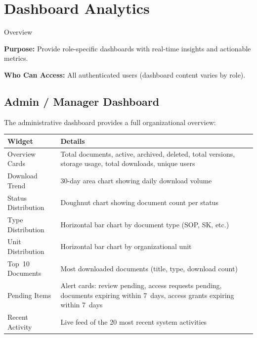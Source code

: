 \section{Dashboard Analytics}

\begin{ugModule}{Overview}

  \textbf{Purpose:}
  Provide role-specific dashboards with real-time insights and
  actionable metrics.

  \textbf{Who Can Access:}
  All authenticated users (dashboard content varies by role).
\end{ugModule}

\subsection{Admin / Manager Dashboard}

The administrative dashboard provides a full organizational
overview:

\begin{tabularx}{\textwidth}{@{} l X @{}}
  \toprule
  \textbf{Widget} & \textbf{Details} \\
  \midrule
  Overview Cards
    & Total documents, active, archived, deleted, total
      versions, storage usage, total downloads,
      unique users \\
  Download Trend
    & 30-day area chart showing daily download volume \\
  Status Distribution
    & Doughnut chart showing document count per status \\
  Type Distribution
    & Horizontal bar chart by document type
      (SOP, SK, etc.) \\
  Unit Distribution
    & Horizontal bar chart by organizational unit \\
  Top~10 Documents
    & Most downloaded documents (title, type,
      download count) \\
  Pending Items
    & Alert cards: review pending, access requests
      pending, documents expiring within 7~days,
      access grants expiring within 7~days \\
  Recent Activity
    & Live feed of the 20 most recent system
      activities \\
  \bottomrule
\end{tabularx}

